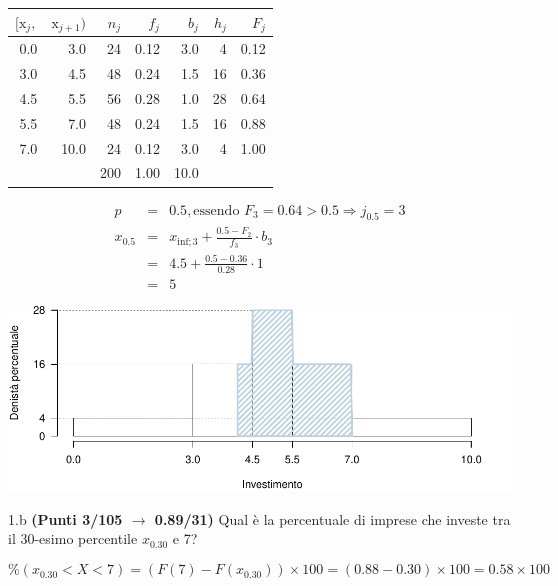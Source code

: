 \documentclass[
  11pt,
]{book}
\theoremstyle{mytheoremstyle}
\theoremstyle{mydefstyle}
\newenvironment{sol}
  {
  \begin{tcolorbox}[enhanced,breakable,arc=0.1mm,boxrule=1pt,colback=white,colframe=iblue,
  title=\bf \fontfamily{lmss}\selectfont \hspace{.5 cm} Soluzione,drop fuzzy shadow]

}{
\end{tcolorbox}
  }
\begin{document}
\begin{sol}

\begin{table}[H]
\centering
\begin{tabular}{rrrrrrr}
\toprule
$[\text{x}_j,$ & $\text{x}_{j+1})$ & $n_j$ & $f_j$ & $b_j$ & $h_j$ & $F_j$\\
\midrule
0.0 & 3.0 & 24 & 0.12 & 3.0 & 4 & 0.12\\
3.0 & 4.5 & 48 & 0.24 & 1.5 & 16 & 0.36\\
4.5 & 5.5 & 56 & 0.28 & 1.0 & 28 & 0.64\\
5.5 & 7.0 & 48 & 0.24 & 1.5 & 16 & 0.88\\
7.0 & 10.0 & 24 & 0.12 & 3.0 & 4 & 1.00\\
 &  & 200 & 1.00 & 10.0 &  & \\
\bottomrule
\end{tabular}
\end{table}

\begin{eqnarray*}
  p &=&  0.5 , \text{essendo }F_{ 3 }= 0.64  > 0.5  \Rightarrow j_{ 0.5 }= 3 \\
  x_{ 0.5 } &=& x_{\text{inf}; 3 } + \frac{ { 0.5 } - F_{ 2 }} {f_{ 3 }} \cdot b_{ 3 } \\
            &=&  4.5  + \frac {{ 0.5 } -  0.36 } { 0.28 } \cdot  1  \\
            &=&  5 
\end{eqnarray*}

\begin{center}\includegraphics{Esami_passati_con_soluzioni_files/figure-latex/2024-125-1} \end{center}

\end{sol}

1.b \textbf{(Punti 3/105 \(\rightarrow\) 0.89/31)} Qual è la percentuale di imprese che investe tra il 30-esimo percentile \(x_{0.30}\) e 7?

\begin{sol}
\[
\%(x_{0.30}<X<7) = (F(7)-F(x_{0.30}))\times 100 = (0.88- 0.30)\times 100=0.58\times 100
\]

\end{sol}
\end{document}
